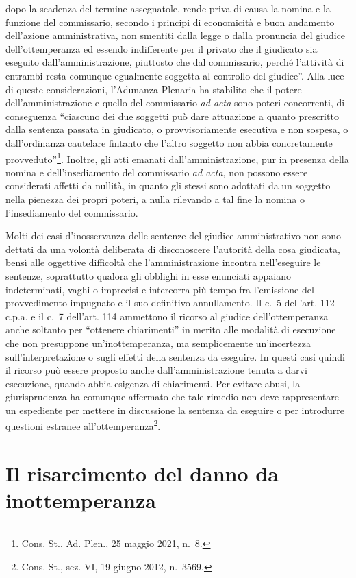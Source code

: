 \documentclass[12pt,it,a4paper,]{report}
\begin{document}
dopo la scadenza del termine assegnatole, rende priva di causa la nomina
e la funzione del commissario, secondo i principi di economicità e buon
andamento dell'azione amministrativa, non smentiti dalla legge o dalla
pronuncia del giudice dell'ottemperanza ed essendo indifferente per il
privato che il giudicato sia eseguito dall'amministrazione, piuttosto
che dal commissario, perché l'attività di entrambi resta comunque
egualmente soggetta al controllo del giudice''. Alla luce di queste
considerazioni, l'Adunanza Plenaria ha stabilito che il potere
dell'amministrazione e quello del commissario \emph{ad acta} sono poteri
concorrenti, di conseguenza ``ciascuno dei due soggetti può dare
attuazione a quanto prescritto dalla sentenza passata in giudicato, o
provvisoriamente esecutiva e non sospesa, o dall'ordinanza cautelare
fintanto che l'altro soggetto non abbia concretamente
provveduto''\footnote{Cons. St., Ad. Plen., 25 maggio 2021, n.~8.}.
Inoltre, gli atti emanati dall'amministrazione, pur in presenza della
nomina e dell'insediamento del commissario \emph{ad acta}, non possono
essere considerati affetti da nullità, in quanto gli stessi sono
adottati da un soggetto nella pienezza dei propri poteri, a nulla
rilevando a tal fine la nomina o l'insediamento del commissario.

Molti dei casi d'inosservanza delle sentenze del giudice amministrativo
non sono dettati da una volontà deliberata di disconoscere l'autorità
della cosa giudicata, bensì alle oggettive difficoltà che
l'amministrazione incontra nell'eseguire le sentenze, soprattutto
qualora gli obblighi in esse enunciati appaiano indeterminati, vaghi o
imprecisi e intercorra più tempo fra l'emissione del provvedimento
impugnato e il suo definitivo annullamento. Il c.~5 dell'art. 112 c.p.a.
e il c.~7 dell'art. 114 ammettono il ricorso al giudice
dell'ottemperanza anche soltanto per ``ottenere chiarimenti'' in merito
alle modalità di esecuzione che non presuppone un'inottemperanza, ma
semplicemente un'incertezza sull'interpretazione o sugli effetti della
sentenza da eseguire. In questi casi quindi il ricorso può essere
proposto anche dall'amministrazione tenuta a darvi esecuzione, quando
abbia esigenza di chiarimenti. Per evitare abusi, la giurisprudenza ha
comunque affermato che tale rimedio non deve rappresentare un espediente
per mettere in discussione la sentenza da eseguire o per introdurre
questioni estranee all'ottemperanza\footnote{Cons. St., sez. VI, 19
  giugno 2012, n.~3569.}.

\hypertarget{il-risarcimento-del-danno-da-inottemperanza}{%
\section{Il risarcimento del danno da
inottemperanza}\label{il-risarcimento-del-danno-da-inottemperanza}}
\end{document}
